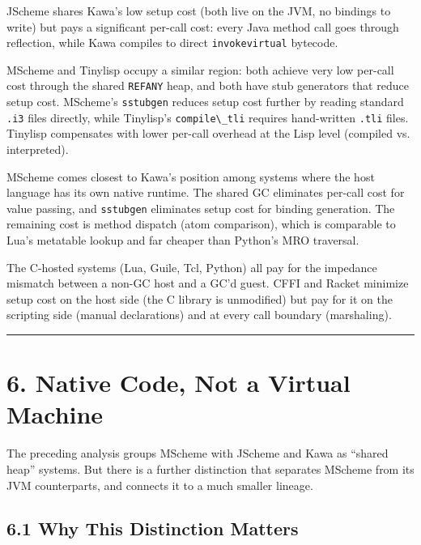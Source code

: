 \documentclass[
  12pt,
]{report}
\newcommand{\passthrough}[1]{#1}
\begin{document}
JScheme shares Kawa's low setup cost (both live on the JVM, no bindings
to write) but pays a significant per-call cost: every Java method call
goes through reflection, while Kawa compiles to direct
\passthrough{\lstinline!invokevirtual!} bytecode.

MScheme and Tinylisp occupy a similar region: both achieve very low
per-call cost through the shared \passthrough{\lstinline!REFANY!} heap,
and both have stub generators that reduce setup cost. MScheme's
\passthrough{\lstinline!sstubgen!} reduces setup cost further by reading
standard \passthrough{\lstinline!.i3!} files directly, while Tinylisp's
\passthrough{\lstinline!compile\_tli!} requires hand-written
\passthrough{\lstinline!.tli!} files. Tinylisp compensates with lower
per-call overhead at the Lisp level (compiled vs. interpreted).

MScheme comes closest to Kawa's position among systems where the host
language has its own native runtime. The shared GC eliminates per-call
cost for value passing, and \passthrough{\lstinline!sstubgen!}
eliminates setup cost for binding generation. The remaining cost is
method dispatch (atom comparison), which is comparable to Lua's
metatable lookup and far cheaper than Python's MRO traversal.

The C-hosted systems (Lua, Guile, Tcl, Python) all pay for the impedance
mismatch between a non-GC host and a GC'd guest. CFFI and Racket
minimize setup cost on the host side (the C library is unmodified) but
pay for it on the scripting side (manual declarations) and at every call
boundary (marshaling).

\begin{center}\rule{0.5\linewidth}{0.5pt}\end{center}

\section{6. Native Code, Not a Virtual
Machine}\label{native-code-not-a-virtual-machine}

The preceding analysis groups MScheme with JScheme and Kawa as ``shared
heap'' systems. But there is a further distinction that separates
MScheme from its JVM counterparts, and connects it to a much smaller
lineage.

\subsection{6.1 Why This Distinction
Matters}\label{why-this-distinction-matters}
\end{document}
